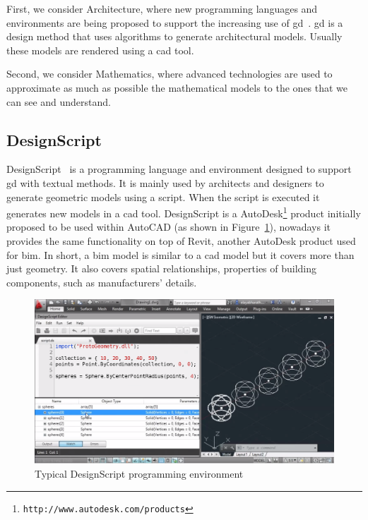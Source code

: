 First, we consider Architecture, where new programming languages and environments are being proposed to support the increasing use of \gls{gd}~\cite{mccormack2004generative}. \gls{gd} is a design method that uses algorithms to generate architectural models. Usually these models are rendered using a \gls{cad} tool. 

Second, we consider Mathematics, where advanced technologies are used to approximate as much as possible the mathematical models to the ones that we can see and understand.

\subsection{DesignScript}
\label{subsec:designscript}
DesignScript~\cite{aish2012designscript} is a programming language and environment designed to support \gls{gd} with textual methods. It is mainly used by architects and designers to generate geometric models using a script. When the script is executed it generates new models in a \gls{cad} tool. DesignScript is a AutoDesk\footnote{\texttt{http://www.autodesk.com/products}} product initially proposed to be used within AutoCAD (as shown in Figure~\ref{fig:ds}), nowadays it provides the same functionality on top of Revit, another AutoDesk product used for \gls{bim}. In short, a \gls{bim} model is similar to a \gls{cad} model but it covers more than just geometry. It also covers spatial relationships, properties of building components, such as manufacturers' details.

\begin{figure}[!htbp]
  \centering
  \includegraphics[width=1.0\textwidth]{images/designScriptIDE}
    \caption{Typical DesignScript programming environment} 
  \label{fig:ds}
\end{figure} 

